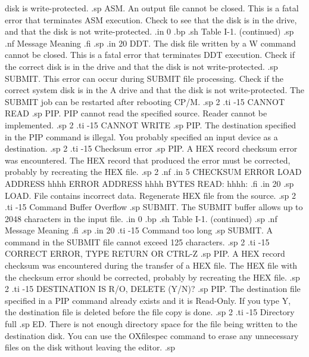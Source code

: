 disk is write-protected.
.sp
ASM.  An output file cannot be closed.  This is a fatal error 
that terminates ASM execution.  Check to see that the disk is in 
the drive, and that the disk is not write-protected.
.in 0
.bp
.sh
                     Table I-1.  (continued)
.sp
.nf
     Message        Meaning
.fi
.sp
.in 20
DDT.  The disk file written by a W command cannot be closed.  
This is a fatal error that terminates DDT execution.  Check if 
the correct disk is in the drive and that the disk is not write-protected.
.sp
SUBMIT.  This error can occur during SUBMIT file processing.  
Check if the correct system disk is in the A drive and that the 
disk is not write-protected.  The SUBMIT job can be restarted 
after rebooting CP/M.
.sp 2
.ti -15
CANNOT READ
.sp
PIP.  PIP cannot read the specified source.  Reader cannot be 
implemented.
.sp 2
.ti -15
CANNOT WRITE
.sp
PIP.  The destination specified in the PIP command is illegal.  
You probably specified an input device as a destination.
.sp 2
.ti -15
Checksum error
.sp
PIP.  A HEX record checksum error was encountered.  The HEX 
record that produced the error must be corrected, probably by 
recreating the HEX file.
.sp 2
.nf
.in 5
CHECKSUM ERROR
LOAD ADDRESS hhhh
ERROR ADDRESS hhhh
BYTES READ:
hhhh:
.fi
.in 20
.sp
LOAD.  File contains incorrect data.  Regenerate HEX file from 
the source.
.sp 2
.ti -15
Command Buffer Overflow
.sp
SUBMIT.  The SUBMIT buffer allows up to 2048 characters in the 
input file.
.in 0
.bp
.sh
                     Table I-1.  (continued)
.sp
.nf
     Message        Meaning
.fi
.sp
.in 20
.ti -15
Command too long
.sp
SUBMIT.  A command in the SUBMIT file cannot exceed 125 
characters.
.sp 2
.ti -15
CORRECT ERROR, TYPE RETURN OR CTRL-Z
.sp
PIP.  A HEX record checksum was encountered during the transfer 
of a HEX file.  The HEX file with the checksum error should be 
corrected, probably by recreating the HEX file.
.sp 2
.ti -15
DESTINATION IS R/O, DELETE (Y/N)?
.sp
PIP.  The destination file specified in a PIP command already 
exists and it is Read-Only.  If you type Y, the destination file 
is deleted before the file copy is done.
.sp 2
.ti -15
Directory full
.sp
ED.  There is not enough directory space for the file being 
written to the destination disk.  You can use the OXfilespec 
command to erase any unnecessary files on the disk without 
leaving the editor.
.sp
